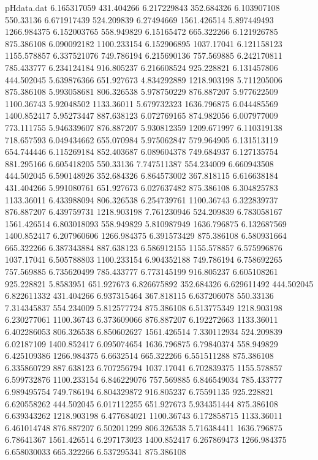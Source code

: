 \begin{filecontents}{pHdata.dat}
6.165317059	431.404266
6.217229843	352.684326
6.103907108	550.33136
6.671917439	524.209839
6.27494669	1561.426514
5.897449493	1266.984375
6.152003765	558.949829
6.15165472	665.322266
6.121926785	875.386108
6.090092182	1100.233154
6.152906895	1037.17041
6.121158123	1155.578857
6.337521076	749.786194
6.215690136	757.569885
6.242170811	785.433777
6.234124184	916.805237
6.216608524	925.228821
6.131457806	444.502045
5.639876366	651.927673
4.834292889	1218.903198
5.711205006	875.386108
5.993058681	806.326538
5.978750229	876.887207
5.977622509	1100.36743
5.92048502	1133.36011
5.679732323	1636.796875
6.044485569	1400.852417
5.95273447	887.638123
6.072769165	874.982056
6.007977009	773.111755
5.946339607	876.887207
5.930812359	1209.671997
6.110319138	718.657593
6.049434662	655.070984
5.975062847	579.964905
6.131513119	654.744446
6.115269184	852.403687
6.089604378	749.684937
6.127135754	881.295166
6.605418205	550.33136
7.747511387	554.234009
6.660943508	444.502045
6.590148926	352.684326
6.864573002	367.818115
6.616638184	431.404266
5.991080761	651.927673
6.027637482	875.386108
6.304825783	1133.36011
6.433988094	806.326538
6.254739761	1100.36743
6.322839737	876.887207
6.439759731	1218.903198
7.761230946	524.209839
6.783058167	1561.426514
6.803018093	558.949829
5.810987949	1636.796875
6.132687569	1400.852417
6.207960606	1266.984375
6.391573429	875.386108
6.580931664	665.322266
6.387343884	887.638123
6.586912155	1155.578857
6.575996876	1037.17041
6.505788803	1100.233154
6.904352188	749.786194
6.758692265	757.569885
6.735620499	785.433777
6.773145199	916.805237
6.605108261	925.228821
5.8583951	651.927673
6.826675892	352.684326
6.629611492	444.502045
6.822611332	431.404266
6.937315464	367.818115
6.637206078	550.33136
7.314345837	554.234009
5.812577724	875.386108
6.513775349	1218.903198
6.230277061	1100.36743
6.373609066	876.887207
6.192272663	1133.36011
6.402286053	806.326538
6.850602627	1561.426514
7.330112934	524.209839
6.02187109	1400.852417
6.095074654	1636.796875
6.79840374	558.949829
6.425109386	1266.984375
6.6632514	665.322266
6.551511288	875.386108
6.335860729	887.638123
6.707256794	1037.17041
6.702839375	1155.578857
6.599732876	1100.233154
6.846229076	757.569885
6.846549034	785.433777
6.989495754	749.786194
6.804329872	916.805237
6.75591135	925.228821
6.620558262	444.502045
6.017112255	651.927673
5.934351444	875.386108
6.639343262	1218.903198
6.477684021	1100.36743
6.172858715	1133.36011
6.461014748	876.887207
6.502011299	806.326538
5.716384411	1636.796875
6.78641367	1561.426514
6.297173023	1400.852417
6.267869473	1266.984375
6.658030033	665.322266
6.537295341	875.386108

\end{filecontents}
